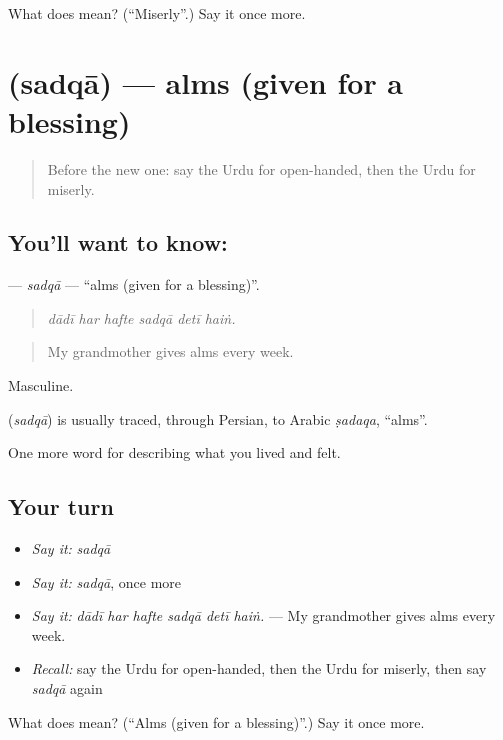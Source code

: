 \begin{tcolorbox}[breakable,colback=teal!4,colframe=teal!35!black,title={Before you move on}]
What does  mean? (\textquotedblleft{}Miserly\textquotedblright{}.) Say it once more.
\end{tcolorbox}
\section[\texorpdfstring{\ur{صدقہ} (sadqā)}{صدقہ (sadqā)}]{ (sadqā) — alms (given for a blessing)}

\label{lesson:UR-C459-sadqa}



\begin{quote}
Before the new one: say the Urdu for open-handed, then the Urdu for miserly.
\end{quote}

\subsection*{You'll want to know: }
\textbf{} — \emph{sadqā} — \textquotedblleft{}alms (given for a blessing)\textquotedblright{}.

\begin{quote}
     
\end{quote}

\begin{quote}
\emph{dādī har hafte sadqā detī haiṅ.}
\end{quote}

\begin{quote}
My grandmother gives alms every week.
\end{quote}

Masculine.

\begin{cousinweb}
\textbf{} (\emph{sadqā}) is usually traced, through Persian, to Arabic \emph{ṣadaqa}, \textquotedblleft{}alms\textquotedblright{}.
\end{cousinweb}

\begin{grammarlens}[title={What you've built}]
One more word for describing what you lived and felt.
\end{grammarlens}

\subsection*{Your turn}
\begin{itemize}
\raggedright
  \item \emph{Say it:} \emph{sadqā}
  \item \emph{Say it:} \emph{sadqā}, once more
  \item \emph{Say it:} \emph{dādī har hafte sadqā detī haiṅ.} — My grandmother gives alms every week.
  \item \emph{Recall:} say the Urdu for open-handed, then the Urdu for miserly, then say \emph{sadqā} again
\end{itemize}

\begin{tcolorbox}[breakable,colback=teal!4,colframe=teal!35!black,title={Before you move on}]
What does  mean? (\textquotedblleft{}Alms (given for a blessing)\textquotedblright{}.) Say it once more.
\end{tcolorbox}
